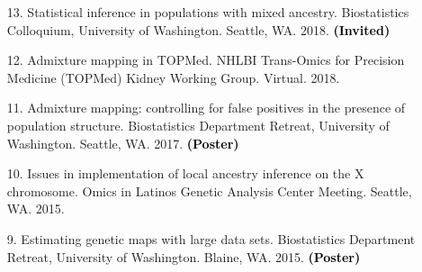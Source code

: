 \documentclass[margin]{res}
\newcommand{\annotate}[1]{\textcolor{black}{\textbf{(#1)}}}
\begin{document}
\begin{resume}
\begin{itemize}


\item[13.] %
Statistical inference in populations with mixed ancestry. 
Biostatistics Colloquium, University of Washington. Seattle, WA. 2018.  
\annotate{Invited}

\item[12.] Admixture mapping in TOPMed. 
NHLBI Trans-Omics for Precision Medicine (TOPMed) Kidney Working Group. Virtual. 2018.  


\item[11.] %
Admixture mapping: controlling for false positives in the presence of population structure. 
Biostatistics Department Retreat, University of Washington. Seattle, WA. 2017. 
\annotate{Poster}



\item[10.] %
Issues in implementation of local ancestry inference on the X chromosome. 
Omics in Latinos Genetic Analysis Center Meeting. Seattle, WA. 2015.

\item[9.] %
Estimating genetic maps with large data sets. 
Biostatistics Department Retreat, University of Washington. Blaine, WA. 2015. 
\annotate{Poster}



\end{itemize}
\end{resume}
\end{document}
